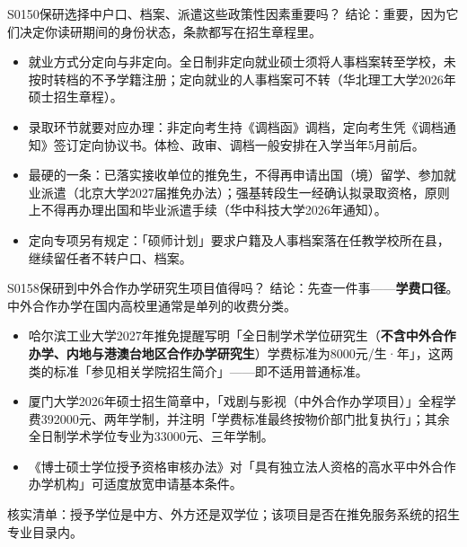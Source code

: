 \begin{qa}{S0150}{保研选择中户口、档案、派遣这些政策性因素重要吗？}
结论：重要，因为它们决定你读研期间的身份状态，条款都写在招生章程里。

\begin{itemize}
  \item 就业方式分定向与非定向。全日制非定向就业硕士须将人事档案转至学校，未按时转档的不予学籍注册；定向就业的人事档案可不转（华北理工大学2026年硕士招生章程）。
  \item 录取环节就要对应办理：非定向考生持《调档函》调档，定向考生凭《调档通知》签订定向协议书。体检、政审、调档一般安排在入学当年5月前后。
  \item 最硬的一条：已落实接收单位的推免生，不得再申请出国（境）留学、参加就业派遣（北京大学2027届推免办法）；强基转段生一经确认拟录取资格，原则上不得再办理出国和毕业派遣手续（华中科技大学2026年通知）。
  \item 定向专项另有规定：「硕师计划」要求户籍及人事档案落在任教学校所在县，继续留任者不转户口、档案。
\end{itemize}
\end{qa}

\begin{qa}{S0158}{保研到中外合作办学研究生项目值得吗？}
结论：先查一件事——\textbf{学费口径}。中外合作办学在国内高校里通常是单列的收费分类。

\begin{itemize}
  \item 哈尔滨工业大学2027年推免提醒写明「全日制学术学位研究生（\textbf{不含中外合作办学、内地与港澳台地区合作办学研究生}）学费标准为8000元/生·年」，这两类的标准「参见相关学院招生简介」——即不适用普通标准。
  \item 厦门大学2026年硕士招生简章中，「戏剧与影视（中外合作办学项目）」全程学费392000元、两年学制，并注明「学费标准最终按物价部门批复执行」；其余全日制学术学位专业为33000元、三年学制。
  \item 《博士硕士学位授予资格审核办法》对「具有独立法人资格的高水平中外合作办学机构」可适度放宽申请基本条件。
\end{itemize}

核实清单：授予学位是中方、外方还是双学位；该项目是否在推免服务系统的招生专业目录内。
\end{qa}

